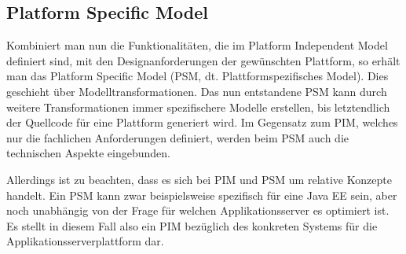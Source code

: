 \subsection{Platform Specific Model} \label{PSM}
Kombiniert man nun die Funktionalitäten, die im Platform Independent Model definiert sind, mit den Designanforderungen der gewünschten Plattform, so erhält man das Platform Specific Model (PSM, dt. Plattformspezifisches Model). Dies geschieht über Modelltransformationen. Das nun entstandene PSM kann durch weitere Transformationen immer spezifischere Modelle erstellen, bis letztendlich der Quellcode für eine Plattform generiert wird. Im Gegensatz zum PIM, welches nur die
fachlichen Anforderungen definiert, werden beim PSM auch die technischen Aspekte
eingebunden.
 
Allerdings ist zu beachten, dass es sich bei PIM und PSM um relative Konzepte handelt. Ein PSM kann zwar beispielsweise spezifisch für eine Java EE sein, aber noch unabhängig von der Frage für welchen Applikationsserver es optimiert ist. Es stellt in diesem Fall also ein PIM bezüglich des konkreten Systems für die Applikationsserverplattform dar.